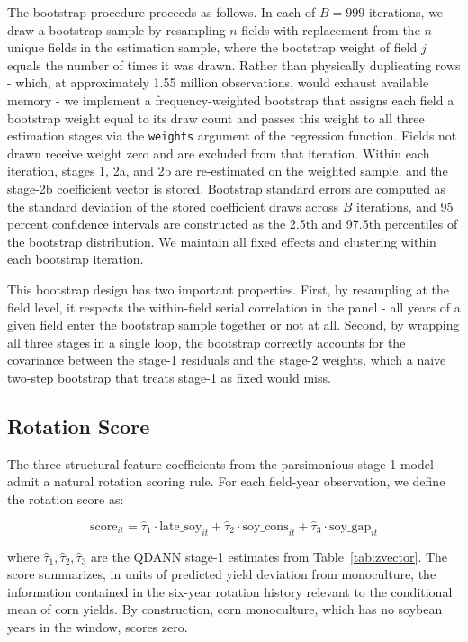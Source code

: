 \documentclass[12pt,letterpaper]{article}
\theoremstyle{remark}
\theoremstyle{remark}
\theoremstyle{plain}
\theoremstyle{definition}
\begin{document}
The bootstrap procedure proceeds as follows. In each of $B = 999$ iterations, we draw a bootstrap sample by resampling $n$ fields with replacement from the $n$ unique fields in the estimation sample, where the bootstrap weight of field $j$ equals the number of times it was drawn. Rather than physically duplicating rows - which, at approximately 1.55 million observations, would exhaust available memory - we implement a frequency-weighted bootstrap that assigns each field a bootstrap weight equal to its draw count and passes this weight to all three estimation stages via the \texttt{weights} argument of the regression function. Fields not drawn receive weight zero and are excluded from that iteration. Within each iteration, stages 1, 2a, and 2b are re-estimated on the weighted sample, and the stage-2b coefficient vector is stored. Bootstrap standard errors are computed as the standard deviation of the stored coefficient draws across $B$ iterations, and 95 percent confidence intervals are constructed as the 2.5th and 97.5th percentiles of the bootstrap distribution. We maintain all fixed effects and clustering within each bootstrap iteration.

This bootstrap design has two important properties. First, by resampling at the field level, it respects the within-field serial correlation in the panel - all years of a given field enter the bootstrap sample together or not at all. Second, by wrapping all
three stages in a single loop, the bootstrap correctly accounts for the covariance between the stage-1 residuals and the stage-2 weights, which a naive two-step bootstrap that treats stage-1 as fixed would miss.

\subsection{\label{subsec:rot_score}Rotation Score}
The three structural feature coefficients from the parsimonious stage-1 model admit a natural rotation scoring rule. For each field-year observation, we define the rotation score as:

\begin{equation}
    \text{score}_{it} = \hat{\tau}_1 \cdot \text{late\_soy}_{it} + \hat{\tau}_2 \cdot \text{soy\_cons}_{it} + \hat{\tau}_3 \cdot \text{soy\_gap}_{it}\label{eq:score}
\end{equation}

where $\hat{\tau}_1, \hat{\tau}_2, \hat{\tau}_3$ are the QDANN stage-1 estimates from Table~\ref{tab:zvector}. The score summarizes, in units of predicted yield deviation from monoculture, the information contained in the six-year rotation history relevant to the conditional mean of corn yields. By construction, corn monoculture, which has no soybean years in the window, scores zero.
\end{document}
